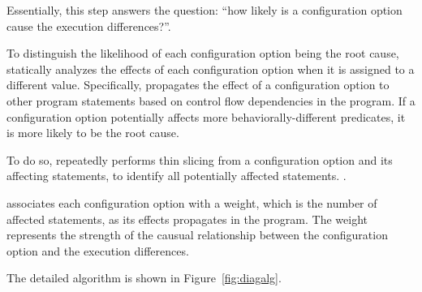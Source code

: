 Essentially, this step answers the question:
``how likely is a configuration
option cause the execution differences?''.




To distinguish the likelihood of each configuration
option being the root cause, \ourtool statically analyzes
the effects of each configuration option when it is
assigned to a different value.
Specifically, \ourtool propagates the effect of
a configuration option to other program statements
based on control flow dependencies in the program. 
If a configuration option potentially affects more
behaviorally-different predicates, it is more likely
to be the root cause.

To do so, \ourtool repeatedly performs thin slicing
from a configuration option and its affecting statements,
to identify all potentially affected statements.
.

\ourtool associates each configuration option
with a weight, which is the number of affected statements,
as its effects propagates
in the program.  The weight represents the strength of
the causual relationship between the configuration option
and the execution differences.

The detailed algorithm is shown in Figure~\ref{fig:diagalg}.






